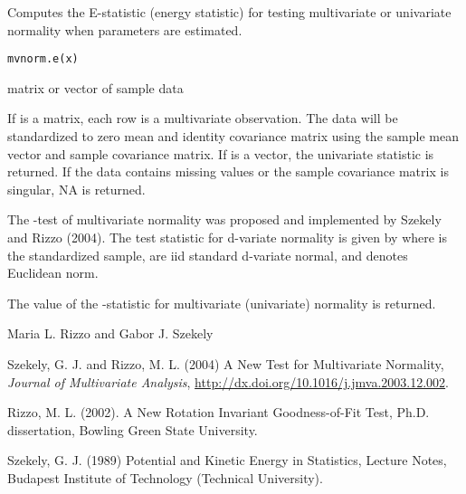 \documentclass{article}
\begin{document}
\begin{Description}\relax
Computes the E-statistic (energy statistic) for testing multivariate 
or univariate normality when parameters are estimated.
\end{Description}
\begin{Usage}
\begin{verbatim}
mvnorm.e(x)
\end{verbatim}
\end{Usage}
\begin{Arguments}
\begin{ldescription}
\item[\code{x}] matrix or vector of sample data
\end{ldescription}
\end{Arguments}
\begin{Details}\relax
If  is a matrix, each row is a multivariate observation. The
data will be standardized to zero mean and identity covariance matrix
using the sample mean vector and sample covariance matrix. If 
is a vector, the univariate statistic  is returned. 
If the data contains missing values or the sample covariance matrix is 
singular, NA is returned.

The -test of multivariate normality was proposed
and implemented by Szekely and Rizzo (2004). The test statistic for 
d-variate normality is given by
where  is the standardized sample, 
 are iid standard d-variate normal, and
\eqn{\| \cdot \|}{|| ||} denotes Euclidean norm.\end{Details}
\begin{Value}
The value of the -statistic for multivariate
(univariate) normality is returned.\end{Value}
\begin{Author}\relax
Maria L. Rizzo  and
Gabor J. Szekely 
\end{Author}
\begin{References}\relax
Szekely, G. J. and Rizzo, M. L. (2004) A New Test for 
Multivariate Normality, \emph{Journal of Multivariate Analysis},
\url{http://dx.doi.org/10.1016/j.jmva.2003.12.002}.

Rizzo, M. L. (2002). A New Rotation Invariant Goodness-of-Fit Test,
Ph.D. dissertation, Bowling Green State University.

Szekely, G. J. (1989) Potential and Kinetic Energy in Statistics, 
Lecture Notes, Budapest Institute of Technology (Technical University).\end{References}
\end{document}
